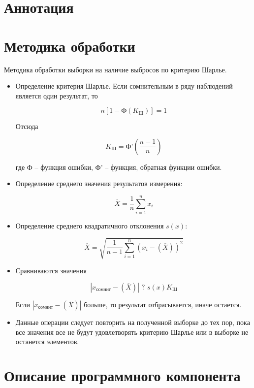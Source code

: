 \documentclass[a4paper,14pt]{article}
\begin{document}


\section{Аннотация}



\section{Методика обработки}

Методика обработки выборки на наличие выбросов по критерию Шарлье.
\begin{itemize}
	\item Определение критерия Шарлье. Если сомнительным в ряду наблюдений является один результат, то
	
	$$n[1 - \text{Ф}(K_{\text{Ш}})] = 1$$
	
	Отсюда 
	
	$$K_{\text{Ш}} =  \text{Ф'}(\frac{n-1}{n})$$
	
	где  $\text{Ф}$ -- функция ошибки, $\text{Ф'}$ -- функция, обратная функции ошибки.
	
	\item Определение среднего значения результатов измерения:
	
	$$\overline{X} = \dfrac{1}{n}\sum_{i=1}^{n}x_i$$
	
	\item Определение среднего квадратичного отклонения $s(x)$:
	
	$$\overline{X} = \sqrt{\dfrac{1}{n-1}\sum_{i=1}^{n}(x_i - (\overline X))^2}$$
	
	\item Сравниваются значения
	
	$$|x_{\text{сомнит}} - (\overline X)| \text{ ? } s(x)K_{\text{Ш}}$$
	
	Если $|x_{\text{сомнит}} - (\overline X)|$ больше, то результат отбрасывается, иначе остается.
	
	\item Данные операции следует повторить на полученной выборке до тех пор, пока все значения все не будут удовлетворять критерию Шарлье или в выборке не останется элементов.
\end{itemize}

\section{Описание программного компонента}
\end{document}
